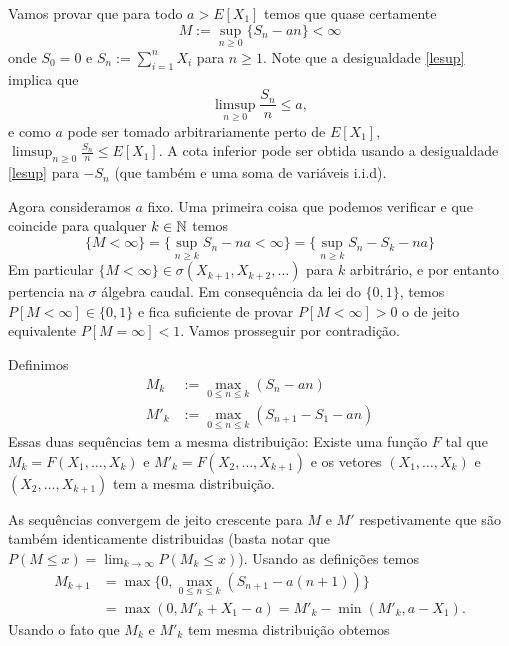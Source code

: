 Vamos provar que para todo $a>E[X_1]$ temos que quase certamente
\begin{equation}\label{lesup}
M := \sup_{n\ge 0} \big\{ S_n - an \big\} < \infty
\end{equation}
onde $S_0 = 0$ e $S_n := \sum_{i = 1}^n X_i$ para $n \geq 1$.
Note que a desigualdade \eqref{lesup} implica que
\begin{equation*}
  \limsup_{n\ge 0} \frac{S_n}{n}\le a,
\end{equation*}
e como $a$ pode ser tomado arbitrariamente perto de $E[X_1]$,  $\limsup_{n\ge 0} \frac{S_n}{n}\le E[X_1]$.
A cota inferior pode ser obtida usando a desigualdade \eqref{lesup} para $-S_n$ (que também e uma soma de variáveis i.i.d).

\medskip

Agora consideramos $a$ fixo.
Uma primeira coisa que podemos verificar e que coincide para qualquer $k \in {\ensuremath{\mathbb N}}$ temos
\begin{equation}
  \{M<\infty\}=\{ \sup_{n\ge k} S_n-n a<\infty \}= \{\sup_{n\ge k} S_n-S_k-na \}
\end{equation}
Em particular $\{M<\infty\}\in \sigma(X_{k+1},X_{k+2},\dots )$ para $k$ arbitrário, e por entanto pertencia na $\sigma$ álgebra caudal.
Em consequência da lei do $\{0,1\}$, temos $P[M<\infty]\in \{0,1\}$ e fica suficiente de provar $P[M<\infty]>0$ o de jeito equivalente
$P[M=\infty]<1$. Vamos prosseguir por contradição.

\medskip

Definimos
\begin{equation*}
  \begin{split}
    M_k &:= \max_{0 \le n \le k} (S_n - an)\\
    M'_k &:= \max_{0 \le n \le k} (S_{n+1} - S_1 - an)
  \end{split}
\end{equation*}
Essas duas sequências tem a mesma distribuição: Existe uma função $F$ tal que $M_k = F(X_1, \dots, X_k)$ e $M'_k = F(X_2, \dots, X_{k+1})$ e os vetores $(X_1, \dots, X_k)$ e $(X_2, \dots, X_{k+1})$ tem a mesma distribuição.

\medskip

As sequências convergem de jeito crescente para $M$ e $M'$ respetivamente que são também identicamente distribuidas (basta notar que $P(M \le x) = \lim_{k \to \infty} P(M_k \le x)$).
Usando as definições temos
\begin{equation*}
  \begin{split}
    M_{k+1}
    & = \max \Big\{ 0, \max_{0 \leq n \leq k} (S_{n + 1} - a(n + 1)) \Big\}\\
    & = \max(0, M'_k + X_1 - a) = M'_k - \min(M'_k, a - X_1).
  \end{split}
\end{equation*}
Usando o fato que $M_k$ e $M'_k$ tem mesma distribuição obtemos

